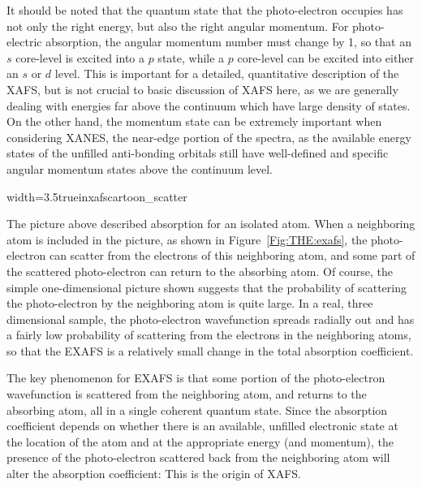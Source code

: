 It should be noted that the quantum state that the photo-electron occupies
has not only the right energy, but also the right angular momentum.  For
photo-electric absorption, the angular momentum number must change by 1, so
that an $s$ core-level is excited into a $p$ state, while a $p$ core-level
can be excited into either an $s$ or $d$ level.  This is important for a
detailed, quantitative description of the XAFS, but is not crucial to basic
discussion of XAFS here, as we are generally dealing with energies far
above the continuum which have large density of states.  On the other hand,
the momentum state can be extremely important when considering XANES, the
near-edge portion of the spectra, as the available energy states of the
unfilled anti-bonding orbitals still have well-defined and specific angular
momentum states above the continuum level.

\begin{Nfig}{width=3.5truein}{xafscartoon_scatter}
  \caption{The photo-electron can scatter from a neighboring atom and
    return to the absorbing atom.  This modulates the amplitude of the
    photo-electron wave-function at the absorbing atom, and also modulates
    the absorption coefficient $\mu(E)$, causing the XAFS.}
  \label{Fig:THE:exafs}
\end{Nfig}

The picture above described absorption for an isolated atom.  When a
neighboring atom is included in the picture, as shown in
Figure~\ref{Fig:THE:exafs}, the photo-electron can scatter from the
electrons of this neighboring atom, and some part of the scattered
photo-electron can return to the absorbing atom.  Of course, the simple
one-dimensional picture shown suggests that the probability of scattering
the photo-electron by the neighboring atom is quite large.  In
a real, three dimensional sample, the photo-electron wavefunction spreads radially out and has a fairly low
probability of scattering from the electrons in the neighboring atoms, so
that the EXAFS is a relatively small change in the total absorption
coefficient.

The key phenomenon for EXAFS is that some portion of the photo-electron
wavefunction is scattered from the neighboring atom, and returns to the
absorbing atom, all in a single coherent quantum state.  Since the
absorption coefficient depends on whether there is an available, unfilled
electronic state at the location of the atom and at the appropriate energy
(and momentum), the presence of the photo-electron scattered back from the
neighboring atom will alter the absorption coefficient:  This is the origin
of XAFS.

